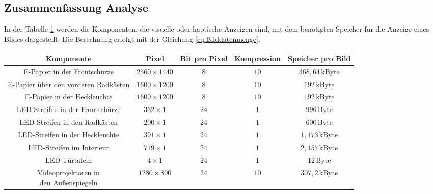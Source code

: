 \subsection{Zusammenfassung Analyse} \label{ZusammendassungAnalyse}
In der Tabelle \ref{tab:Speicherbedarf} werden die Komponenten, die visuelle oder haptische Anzeigen sind, mit dem benötigten Speicher für die Anzeige eines Bildes dargestellt. Die Berechnung erfolgt mit der Gleichung \ref{eq:Bilddatenmenge}.
\begin{table}[hbt]	
	\centering
	\renewcommand{\arraystretch}{1.5}	%
	\label{tab:Speicherbedarf}
	\begin{tabular}{c|cccc}
		\textbf{Komponente} & \parbox[t]{0.1\linewidth}{\centering Pixel} & \parbox[t]{0.11\linewidth}{\centering Bit pro Pixel} & \parbox[t]{0.15\linewidth}{\centering Kompression} & \parbox[t]{0.1\linewidth}{\centering Speicher pro Bild} \\ 
		\hline 
		\hline 
		\parbox[t]{0.3\linewidth}{\centering E-Papier in der Frontschürze} & $ 2560 \times 1440 $ & $ 8 $ & $ 10 $ & $ 368,64\,\mathrm{kByte} $\\ \parbox[t]{0.3\linewidth}{\centering E-Papier über den vorderen Radkästen} & $ 1600 \times 1200 $ & $ 8 $ & $ 10 $ & $ 192\,\mathrm{kByte} $ \\
		\parbox[t]{0.3\linewidth}{\centering E-Papier in der Heckleuchte} & $ 1600 \times 1200 $ & $ 8 $ & $ 10 $ & $ 192\,\mathrm{kByte} $ \\
		\parbox[t]{0.3\linewidth}{\centering LED-Streifen in der Frontschürze} & $ 332 \times 1 $ & $ 24 $ & $ 1 $ & $ 996\,\mathrm{Byte} $ \\
		\parbox[t]{0.3\linewidth}{\centering LED-Streifen in den Radkästen} & $ 200 \times 1 $ & $ 24 $ & $ 1 $ & $ 600\,\mathrm{Byte} $\\ \parbox[t]{0.3\linewidth}{\centering LED-Streifen in der Heckleuchte} & $ 391 \times 1 $ & $ 24 $ & $ 1 $ & $ 1,173\,\mathrm{kByte} $ \\ 
		\parbox[t]{0.3\linewidth}{\centering LED-Streifen im Interieur} & $ 719 \times 1 $ & $ 24 $ & $ 1 $ & $ 2,157\,\mathrm{kByte} $ \\
		\parbox[t]{0.3\linewidth}{\centering LED Türtafeln} & $ 4 \times 1 $ & $ 24 $ & $ 1 $ &  $ 12\,\mathrm{Byte} $ \\
		\parbox[t]{0.3\linewidth}{\centering Videoprojektoren in\\den Außenspiegeln} & $ 1280 \times 800 $ & $ 24 $ & $ 10 $ &   $ 307,2\,\mathrm{kByte} $ \\ 

\end{tabular}
\end{table}
